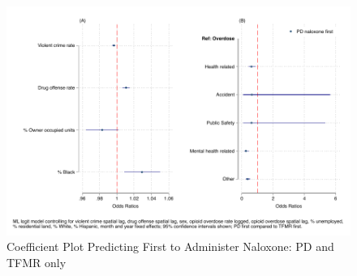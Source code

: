 \newpage 



\newpage
\begin{figure}
    \caption{Coefficient Plot Predicting First to Administer Naloxone: PD and TFMR only}
    \centering
    \includegraphics{figures/me-logit-coef-comb-sens.pdf}
\end{figure}
